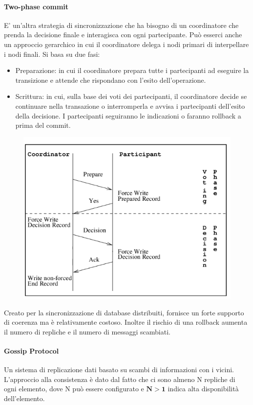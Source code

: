 \documentclass{article}
\begin{document}
		\paragraph{Two-phase commit}
		E' un'altra strategia di sincronizzazione che ha bisogno di un coordinatore che prenda la decisione finale e interagisca con ogni partecipante. Può esserci anche un approccio gerarchico in cui il coordinatore delega i nodi primari di interpellare i nodi finali.
		Si basa su due fasi:
		\begin{itemize}
			\item Preparazione: in cui il coordinatore prepara tutte i partecipanti ad eseguire la transizione e attende che rispondano con l'esito dell'operazione.
			\item Scrittura: in cui, sulla base dei voti dei partecipanti, il coordinatore decide se continuare nella transazione o interromperla e avvisa i partecipanti dell'esito della decisione. I partecipanti seguiranno le indicazioni o faranno rollback a prima del commit.
		\end{itemize}
		\begin{figure}[ht]
			\centering
			\includegraphics[width=0.5\linewidth]{SAC_A5_twophase}
			\label{fig:saca5twophase}
		\end{figure}
		Creato per la sincronizzazione di database distribuiti, fornisce un forte supporto di coerenza ma è relativamente costoso. Inoltre il rischio di una rollback aumenta il numero di repliche e il numero di messaggi scambiati.
		
		\paragraph{Gossip Protocol}
		Un sistema di replicazione dati basato su scambi di informazioni con i vicini. L'approccio alla consistenza è dato dal fatto che ci sono almeno N repliche di ogni elemento, dove N può essere configurato e $\mathbf{N > 1}$ indica alta disponibilità dell'elemento.\\
		
\end{document}
